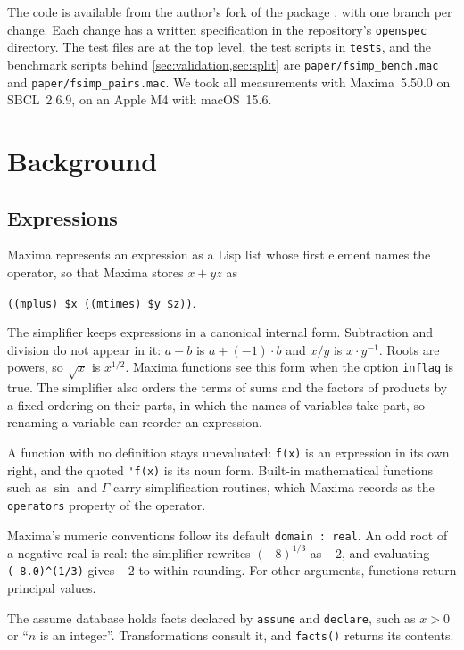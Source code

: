 \documentclass[11pt]{amsart}
\newcommand{\mx}{\lstinline[style=mx]}
\theoremstyle{definition}
\theoremstyle{remark}
\begin{document}
The code is available from the author's fork of the package
\cite{fullsimpFork}, with one branch per change. Each change has a written
specification in the repository's \texttt{openspec} directory. The test files
are at the top level, the test scripts in \texttt{tests}, and the benchmark
scripts behind \cref{sec:validation,sec:split} are \mx|paper/fsimp_bench.mac|
and \mx|paper/fsimp_pairs.mac|. We took all measurements with Maxima~5.50.0 on
SBCL~2.6.9, on an Apple M4 with macOS~15.6.

\section{Background}\label{sec:background}

\subsection{Expressions}

Maxima represents an expression as a Lisp list whose first element names the
operator, so that Maxima stores $x + yz$ as
\begin{center}
\mx|((mplus) $x ((mtimes) $y $z))|.
\end{center}
The simplifier keeps expressions in a canonical internal form. Subtraction and
division do not appear in it: $a - b$ is $a + (-1)\cdot b$ and $x/y$ is
$x \cdot y^{-1}$. Roots are powers, so $\sqrt{x}$ is $x^{1/2}$. Maxima functions see this form
when the option \mx|inflag| is true. The simplifier also orders the terms of
sums and the factors of products by a fixed ordering on their parts, in
which the names of variables take part, so renaming a variable can reorder
an expression.

A function with no definition stays unevaluated: \mx|f(x)| is an expression
in its own right, and the quoted \mx|'f(x)| is its noun form. Built-in
mathematical functions such as $\sin$ and $\Gamma$ carry simplification
routines, which Maxima records as the \mx|operators| property of the
operator.

Maxima's numeric conventions follow its default \mx|domain : real|. An odd root of
a negative real is real: the simplifier rewrites $(-8)^{1/3}$ as $-2$, and
evaluating \mx|(-8.0)^(1/3)| gives $-2$ to within rounding. For other arguments, functions
return principal values.

The assume database holds facts declared by \mx|assume| and \mx|declare|,
such as $x > 0$ or ``$n$ is an integer''. Transformations consult it, and
\mx|facts()| returns its contents.
\end{document}

